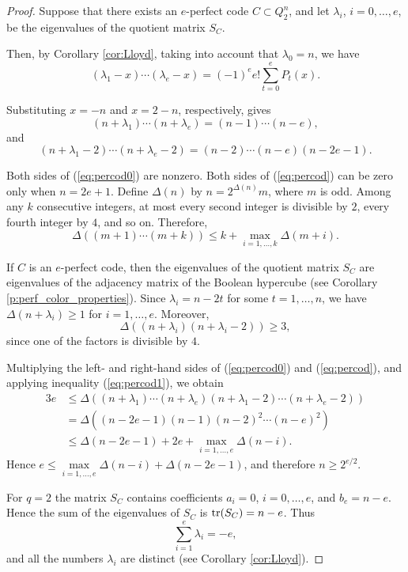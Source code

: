 \documentclass[11pt]{article}
\theoremstyle{definition}
\newcommand{\tr}{{\rm tr}}
\begin{document}
{{{\begin{proof}
Suppose that there exists an $e$-perfect code $C\subset Q^n_2$, and
let $\lambda_i$, $i=0,\dots,e$, be the eigenvalues of the quotient
matrix $S_C$.

Then, by Corollary \ref{cor:Lloyd}, taking into account that
$\lambda_0=n$, we have
\[
(\lambda_1-x)\cdots(\lambda_e-x)
=(-1)^e e!\sum\limits_{t=0}^eP_t(x).
\]

Substituting $x=-n$ and $x=2-n$, respectively, gives
\begin{equation}\label{eq:percod0}
(n+\lambda_1)\cdots(n+\lambda_e)
=(n-1)\cdots(n-e),
\end{equation}
and
\begin{equation}\label{eq:percod}
(n+\lambda_1-2)\cdots(n+\lambda_e-2)
=(n-2)\cdots(n-e)(n-2e-1).
\end{equation}

Both sides  of  (\ref{eq:percod0}) are nonzero. Both sides of   (\ref{eq:percod})  can be zero only
when $n=2e+1$. Define $\Delta(n)$ by $n=2^{\Delta(n)}m$, where $m$ is
odd. Among any $k$ consecutive integers, at most every second integer
is divisible by $2$, every fourth integer by $4$, and so on. Therefore,
\begin{equation}\label{eq:percod1}
\Delta((m+1)\cdots(m+k))
\leq k+\max\limits_{i=1,\dots,k}\Delta(m+i).
\end{equation}

If $C$ is an $e$-perfect code, then the eigenvalues of the quotient
matrix $S_C$ are eigenvalues of the adjacency matrix of the Boolean
hypercube (see Corollary \ref{p:perf_color_properties}). Since
$\lambda_i=n-2t$ for some $t=1,\dots,n$, we have
$\Delta(n+\lambda_i)\geq 1$ for $i=1,\dots,e$. Moreover,
\[
\Delta((n+\lambda_i)(n+\lambda_i-2))\geq 3,
\]
since one of the factors is divisible by $4$.

Multiplying the left- and right-hand sides of (\ref{eq:percod0}) and
(\ref{eq:percod}), and applying inequality (\ref{eq:percod1}), we
obtain
\[
\begin{aligned}
3e
&\leq
\Delta((n+\lambda_1)\cdots(n+\lambda_e)
(n+\lambda_1-2)\cdots(n+\lambda_e-2))\\
&=
\Delta((n-2e-1)(n-1)(n-2)^2\cdots(n-e)^2)\\
&\leq
\Delta(n-2e-1)+2e+
\max\limits_{i=1,\dots,e}\Delta(n-i).
\end{aligned}
\]
Hence
$e\leq
\max\limits_{i=1,\dots,e}\Delta(n-i)+\Delta(n-2e-1)$,
and therefore $n\geq 2^{e/2}$.

For $q=2$ the matrix $S_C$ contains coefficients $a_i=0$,
$i=0,\dots,e$, and $b_e=n-e$. Hence the sum of the eigenvalues of
$S_C$ is
$\tr(S_C)=n-e$.
Thus
\[
\sum\limits_{i=1}^e\lambda_i=-e,
\]
and all the numbers $\lambda_i$ are distinct (see Corollary
\ref{cor:Lloyd}).


\end{proof}}}}
\end{document}

